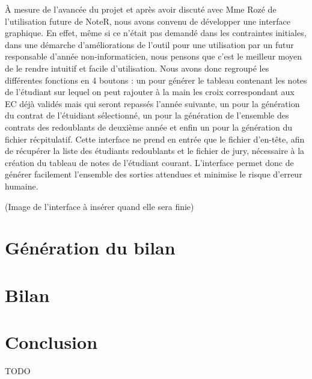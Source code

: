 \documentclass[a4paper,11pt]{article}
\begin{document}
    À mesure de l'avancée du projet et après avoir discuté avec Mme Rozé de l'utilisation future de NoteR, nous avons convenu de développer une interface graphique. En effet, même si ce n'était pas demandé dans les contraintes initiales,  dans une démarche d'améliorations de l'outil pour une utilisation par un futur responsable d'année non-informaticien, nous pensons que c'est le meilleur moyen de le rendre intuitif et facile d'utilisation. Nous avons donc regroupé les différentes fonctions en 4 boutons : un  pour générer le tableau contenant les notes de l'étudiant sur lequel on peut rajouter à la main les croix correspondant aux EC déjà validés mais qui seront repassés l'année suivante, un pour la génération du contrat de l'étuidiant sélectionné, un pour la génération de l'ensemble des contrats des redoublants de deuxième année et enfin un pour la génération du fichier récpitulatif. Cette interface ne prend en entrée que le fichier d'en-tête, afin de récupérer la liste des étudiants redoublants et le fichier de jury, nécessaire à la création du tableau de notes de l'étudiant courant. L'interface permet donc de générer facilement l'ensemble des sorties attendues et minimise le risque d'erreur humaine.

    (Image de l'interface à insérer quand elle sera finie)

\section{Génération du bilan }
 

\section{Bilan }
  

\section*{Conclusion}
TODO


\end{document}

